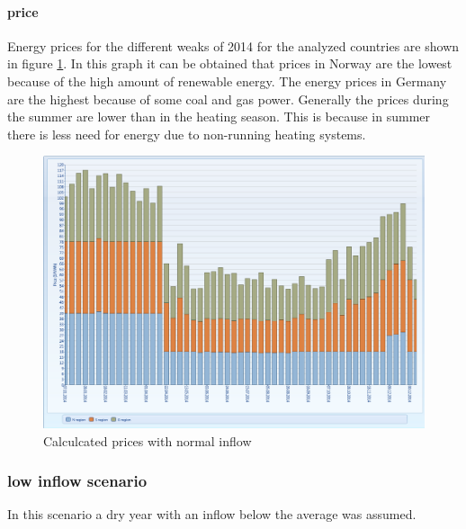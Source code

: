 \documentclass{article}
\begin{document}
\paragraph{price\\}
Energy prices for the different weaks of 2014 for the analyzed countries are shown in figure \ref{fig:MTpricesnormal}. In this graph it can be obtained that prices in Norway are the lowest because of the high amount of renewable energy. The energy prices in Germany are the highest because of some coal and gas power. Generally the prices during the summer are lower than in the heating season. This is because in summer there is less need for energy due to non-running heating systems.
\begin{figure}[htbp]
\begin{center}
\includegraphics[width=13cm,keepaspectratio=true]{figures/MTprices}
\caption{Calculcated prices with normal inflow}
\label{fig:MTpricesnormal}
\end{center}
\end{figure}

\subsubsection{low inflow scenario}
In this scenario a dry year with an inflow below the average was assumed. 
\end{document}
